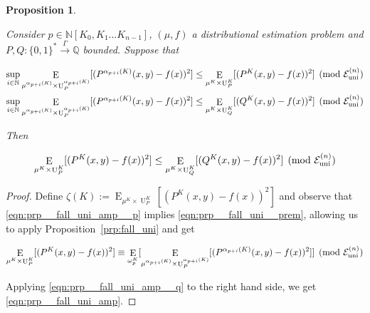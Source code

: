 \documentclass{article}
\numberwithin{equation}{section}
\theoremstyle{definition}
\theoremstyle{plain}
\newtheorem{proposition}{Proposition}[section]
\newcommand{\Bool}{\{0,1\}}
\newcommand{\Words}{{\Bool^*}}
\DeclareMathOperator{\E}{E}
\DeclareMathOperator{\Un}{U}
\newcommand{\Nats}{\mathbb{N}}
\newcommand{\Rats}{\mathbb{Q}}
\newcommand{\NatPoly}{\Nats[K_0, K_1 \ldots K_{n-1}]}
\newcommand{\Fall}{\mathcal{E}}
\newcommand{\FallU}{{\Fall_{\textnormal{uni}}^{(n)}}}
\newcommand{\Scheme}{\xrightarrow{\Gamma}}
\begin{document}
\begin{samepage}
\begin{proposition}
\label{prp:fall_uni_amp}

Consider ${p \in \NatPoly}$, ${(\mu,f)}$ a distributional estimation problem and\\ ${P,Q: \Words \Scheme \Rats}$ bounded. Suppose that

\begin{align}
\label{eqn:prp__fall_uni_amp__p}\sup_{i \in \Nats} \E_{ \mu^{\alpha_{p+i}(K)} \times \Un_P^{\alpha_{p+i}(K)}}[(P^{\alpha_{p+i}(K)}(x,y)-f(x))^2] &\leq \E_{ \mu^{K} \times \Un_P^{K}}[(P^{K}(x,y)-f(x))^2] \pmod \FallU \\
\label{eqn:prp__fall_uni_amp__q}\sup_{i \in \Nats} \E_{\mu^{\alpha_{p+i}(K)} \times \Un_P^{\alpha_{p+i}(K)}}[(P^{\alpha_{p+i}(K)}(x,y)-f(x))^2] &\leq \E_{\mu^{K} \times \Un_Q^{K}}[(Q^{K}(x,y)-f(x))^2] \pmod \FallU
\end{align}

Then

\begin{equation}
\label{eqn:prp__fall_uni_amp}
\E_{\mu^{K} \times \Un_P^{K}}[(P^{K}(x,y)-f(x))^2] \leq \E_{\mu^{K} \times \Un_Q^{K}}[(Q^{K}(x,y)-f(x))^2] \pmod \FallU
\end{equation}

\end{proposition}
\end{samepage}

\begin{proof}

Define ${\zeta(K):=\E_{\mu^{K} \times \Un_P^{K}}[(P^{K}(x,y)-f(x))^2]}$ and observe that \ref{eqn:prp__fall_uni_amp__p} implies \ref{eqn:prp__fall_uni__prem}, allowing us to apply Proposition~\ref{prp:fall_uni} and get

\[\E_{\mu^{K} \times \Un_P^{K}}[(P^{K}(x,y)-f(x))^2] \equiv \E_{\omega_p^K}[\E_{ \mu^{\alpha_{p+i}(K)} \times \Un_P^{\alpha_{p+i}(K)}}[(P^{\alpha_{p+i}(K)}(x,y)-f(x))^2]] \pmod \FallU\]

Applying \ref{eqn:prp__fall_uni_amp__q} to the right hand side, we get \ref{eqn:prp__fall_uni_amp}.
%
\end{proof}
\end{document}
